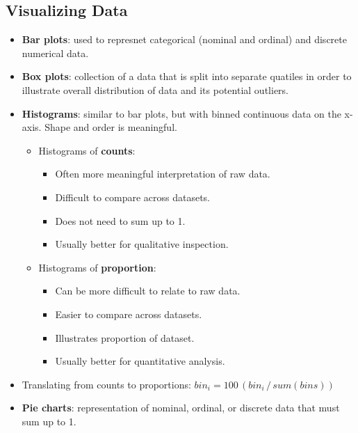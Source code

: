 \documentclass[12pt,a4paper]{article}
\begin{document}
\subsection{Visualizing Data}
\begin{itemize}
    \item \textbf{Bar plots}: used to represnet {\color{o-Sun}categorical} (nominal and ordinal) and {\color{o-Sun}discrete numerical} data.
    \item \textbf{Box plots}: collection of a data that is split into separate quatiles in order to illustrate {\color{o-Sun}overall distribution} of data and its potential outliers.
    \item \textbf{Histograms}: similar to bar plots, but with binned continuous data on the x-axis. {\color{o-Sun}Shape} and {\color{o-Sun}order} is meaningful.
        \begin{itemize}
            \item Histograms of \textbf{counts}: 
                \begin{itemize}
                    \item Often more meaningful interpretation of raw data.
                    \item Difficult to compare across datasets.
                    \item Does not need to sum up to 1.
                    \item Usually better for {\color{o-Sun}qualitative} inspection.
                \end{itemize}
            \item Histograms of \textbf{proportion}:
                \begin{itemize}
                    \item Can be more difficult to relate to raw data.
                    \item Easier to compare across datasets.
                    \item Illustrates proportion of dataset.
                    \item Usually better for {\color{o-Sun}quantitative} analysis.
                \end{itemize}
        \end{itemize}
    \item Translating from counts to proportions: \(bin_i = 100\,(bin_i \,/\, sum(bins))\)
    \item \textbf{Pie charts}: representation of nominal, ordinal, or discrete data that must sum up to 1.
\end{itemize}
\end{document}
